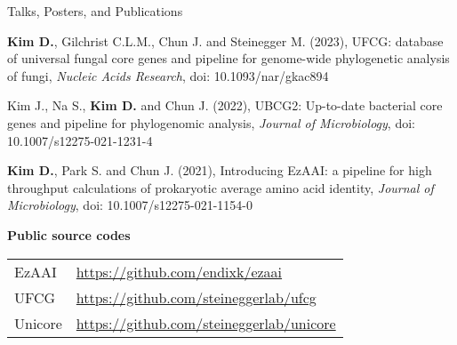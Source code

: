 \documentclass{resume} %
\begin{document}
\begin{rSection}{Talks, Posters, and Publications}
\begin{thebibliography}{10}
{\bf Kim D.}, Gilchrist C.L.M., Chun J. and Steinegger M. (2023),
UFCG: database of universal fungal core genes and pipeline for genome-wide phylogenetic analysis of fungi, {\em Nucleic Acids Research}, doi: 10.1093/nar/gkac894

Kim J., Na S., {\bf Kim D.} and Chun J.  (2022), 
UBCG2: Up-to-date bacterial core genes and pipeline for phylogenomic analysis, {\em Journal of Microbiology}, doi: 10.1007/s12275-021-1231-4

{\bf Kim D.}, Park S. and Chun J. (2021),
Introducing EzAAI: a pipeline for high throughput calculations of prokaryotic average amino acid identity, {\em Journal of Microbiology}, doi: 10.1007/s12275-021-1154-0

\end{thebibliography}
\vspace{4mm}

{\bf Public source codes }\vspace{1mm} 

\begin{tabular}{p{2.5cm}p{14.1cm}}
EzAAI  & \url{https://github.com/endixk/ezaai} \\[1.mm]
UFCG  & \url{https://github.com/steineggerlab/ufcg} \\[1.mm]
Unicore &  \url{https://github.com/steineggerlab/unicore} \\[1.mm]
\end{tabular}
\vspace{1mm}

\end{rSection}
\end{document}
